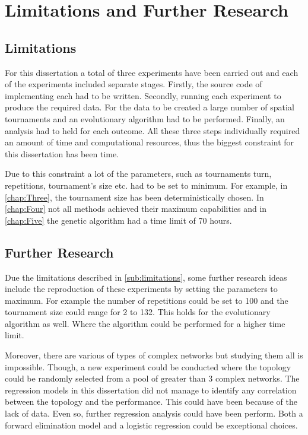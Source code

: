 \section{Limitations and Further Research}
\subsection{Limitations}
\label{sub:limitations}
For this dissertation a total of three experiments have been carried out and
each of the experiments included separate stages. Firstly, the source code of implementing
each had to be written. Secondly, running each experiment to produce the required data.
For the data to be created a large number of spatial
tournaments and an evolutionary algorithm had to be performed. Finally, an
analysis had to held for each outcome. All these three steps individually required
an amount of time and computational resources, thus the biggest constraint for
this dissertation has been time.

Due to this constraint a lot of the parameters, such as tournaments turn, repetitions,
tournament's size etc. had to be set to minimum. For example, in \autoref{chap:Three},
the tournament size has been deterministically chosen. In \autoref{chap:Four}
not all methods achieved their maximum capabilities and in \autoref{chap:Five} the
genetic algorithm had a time limit of 70 hours.

\subsection{Further Research}

Due the limitations described in \autoref{sub:limitations}, some further
research ideas include the reproduction of these experiments by setting the
parameters to maximum. For example the number of repetitions could be set to 100
and the tournament size could range for 2 to 132. This holds for the evolutionary
algorithm as well. Where the algorithm could be performed for a higher time limit.

Moreover, there are various of types of complex networks but studying them all
is impossible. Though, a new experiment could be conducted where the topology
could be randomly selected from a pool of greater than 3 complex networks. The
regression models in this dissertation did not manage to identify any correlation
between the topology and the performance.
This could have been because of the lack of data. Even so, further regression
analysis could have been perform. Both a forward elimination model and a logistic
regression could be exceptional choices.

